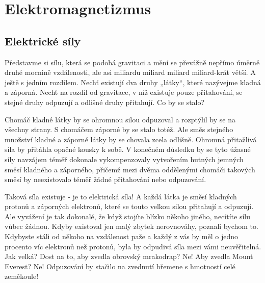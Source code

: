\chapter{Elektromagnetizmus}\label{chap:fey_elmag}
\minitoc
\newpage
  \section{Elektrické síly}
    \cite[s.~13]{Feynman02} Představme si sílu, která se podobá gravitaci a mění se převážně nepřímo
    úměrně druhé mocnině vzdálenosti, ale asi miliardu miliard miliard miliard-krát větší. A ještě s 
    jedním rozdílem. Nechť existují dva druhy „látky“, které nazývejme kladná a záporná. Nechť na 
    rozdíl od gravitace, v níž existuje pouze přitahování, se stejné druhy odpuzují a odlišné druhy 
    přitahují. Co by se stalo?
    
    Chomáč kladné látky by se ohromnou silou odpuzoval a rozptýlil by se na všechny strany. S 
    chomáčem záporné by se stalo totéž. Ale směs stejného množství kladné a záporné látky by se 
    chovala zcela odlišně. Ohromná přitažlivá síla by přitáhla opačné kousky k sobě. V konečném 
    důsledku by se tyto úžasné síly navzájem téměř dokonale vykompenzovaly vytvořením hutných 
    jemných směsí kladného a záporného, přičemž mezi dvěma oddělenými chomáči takových směsí by 
    neexistovalo téměř žádné přitahování nebo odpuzování.
    
    Taková síla existuje - je to elektrická síla! A každá látka je směsí kladných protonů a 
    záporných elektronů, které se touto velkou silou přitahují a odpuzují. Ale vyvážení je tak 
    dokonalé, že když stojíte blízko někoho jiného, necítíte sílu vůbec žádnou. Kdyby existoval jen 
    malý zbytek nerovnováhy, poznali bychom to. Kdybyste stáli od někoho na vzdálenost paže a každý 
    z vás by měl o jedno procento víc elektronů než protonů, byla by odpudivá síla mezi vámi 
    neuvěřitelná. Jak velká? Dost na to, aby zvedla obrovský mrakodrap? Ne! Aby zvedla Mount 
    Everest? Ne! Odpuzování by stačilo na zvednutí břemene s hmotností celé zeměkoule!
    
